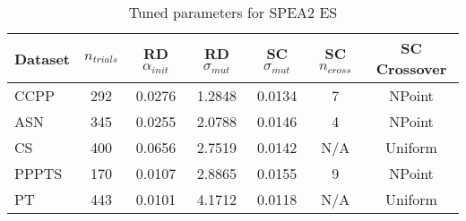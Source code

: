 \begin{table}[ht]
\centering
\caption{Tuned parameters for SPEA2 ES}
\begin{tabular}{lcccccc}
\hline
Dataset & $n_{trials}$ & \acs{RD} $\alpha_{init}$ & \acs{RD} $\sigma_{mut}$ & \acs{SC} $\sigma_{mut}$ & \acs{SC} $n_{cross}$ & \acs{SC} Crossover \\
\hline
CCPP & 292 & 0.0276 & 1.2848 & 0.0134 & 7 & NPoint \\
ASN & 345 & 0.0255 & 2.0788 & 0.0146 & 4 & NPoint \\
CS & 400 & 0.0656 & 2.7519 & 0.0142 & N/A & Uniform \\
PPPTS & 170 & 0.0107 & 2.8865 & 0.0155 & 9 & NPoint \\
PT & 443 & 0.0101 & 4.1712 & 0.0118 & N/A & Uniform \\
\hline
\end{tabular}
\end{table}